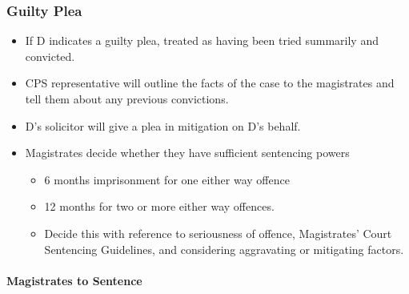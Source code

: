 \documentclass[
]{article}
\providecommand{\tightlist}{%
  \setlength{\itemsep}{0pt}\setlength{\parskip}{0pt}}
\begin{document}
\hypertarget{guilty-plea}{%
\subsubsection{Guilty Plea}\label{guilty-plea}}

\begin{itemize}
\tightlist
\item
  If D indicates a guilty plea, treated as having been tried summarily
  and convicted.
\item
  CPS representative will outline the facts of the case to the
  magistrates and tell them about any previous convictions.
\item
  D's solicitor will give a plea in mitigation on D's behalf.
\item
  Magistrates decide whether they have sufficient sentencing powers

  \begin{itemize}
  \tightlist
  \item
    6 months imprisonment for one either way offence
  \item
    12 months for two or more either way offences.
  \item
    Decide this with reference to seriousness of offence, Magistrates'
    Court Sentencing Guidelines, and considering aggravating or
    mitigating factors.
  \end{itemize}
\end{itemize}

\hypertarget{magistrates-to-sentence}{%
\paragraph{Magistrates to Sentence}\label{magistrates-to-sentence}}
\end{document}
